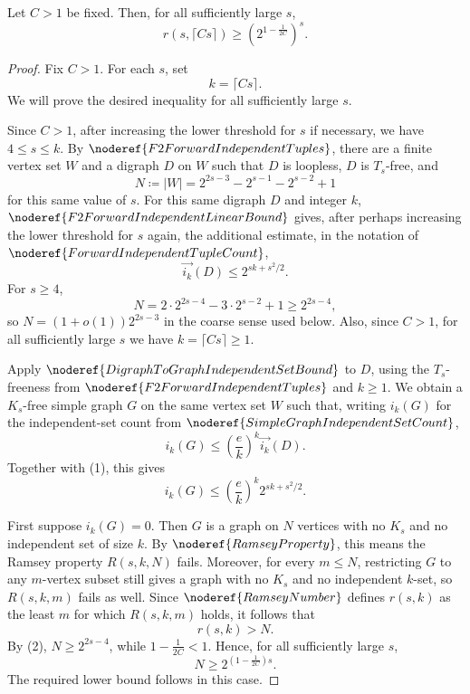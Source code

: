 \begin{theorem}
Let \(C>1\) be fixed. Then, for all sufficiently large \(s\),
\[
  r(s,\lceil Cs\rceil)\ge \left(2^{1-\frac{1}{2C}}\right)^s.
\]
\end{theorem}
\begin{proof}
Fix \(C>1\). For each \(s\), set
\[
  k=\lceil Cs\rceil.
\]
We will prove the desired inequality for all sufficiently large \(s\).

Since \(C>1\), after increasing the lower threshold for \(s\) if necessary, we have \(4\le s\le k\). By \(\noderef{F2ForwardIndependentTuples}\), there are a finite vertex set \(W\) and a digraph \(D\) on \(W\) such that \(D\) is loopless, \(D\) is \(T_s\)-free, and
\[
  N\coloneqq |W|
  =2^{2s-3}-2^{s-1}-2^{s-2}+1
\]
for this same value of \(s\). For this same digraph \(D\) and integer \(k\), \(\noderef{F2ForwardIndependentLinearBound}\) gives, after perhaps increasing the lower threshold for \(s\) again, the additional estimate, in the notation of \(\noderef{ForwardIndependentTupleCount}\),
\[
  \overrightarrow{i_k}(D)
  \le 2^{sk+s^2/2}. \tag{1}
\]
For \(s\ge4\),
\[
  N=2\cdot 2^{2s-4}-3\cdot 2^{s-2}+1
  \ge 2^{2s-4}, \tag{2}
\]
so \(N=(1+o(1))2^{2s-3}\) in the coarse sense used below. Also, since \(C>1\), for all sufficiently large \(s\) we have \(k=\lceil Cs\rceil\ge1\).

Apply \(\noderef{DigraphToGraphIndependentSetBound}\) to \(D\), using the \(T_s\)-freeness from \(\noderef{F2ForwardIndependentTuples}\) and \(k\ge1\). We obtain a \(K_s\)-free simple graph \(G\) on the same vertex set \(W\) such that, writing \(i_k(G)\) for the independent-set count from \(\noderef{SimpleGraphIndependentSetCount}\),
\[
  i_k(G)\le \left(\frac e k\right)^k \overrightarrow{i_k}(D).
\]
Together with (1), this gives
\[
  i_k(G)\le \left(\frac e k\right)^k 2^{sk+s^2/2}. \tag{3}
\]

First suppose \(i_k(G)=0\). Then \(G\) is a graph on \(N\) vertices with no \(K_s\) and no independent set of size \(k\). By \(\noderef{RamseyProperty}\), this means the Ramsey property \(R(s,k,N)\) fails. Moreover, for every \(m\le N\), restricting \(G\) to any \(m\)-vertex subset still gives a graph with no \(K_s\) and no independent \(k\)-set, so \(R(s,k,m)\) fails as well. Since \(\noderef{RamseyNumber}\) defines \(r(s,k)\) as the least \(m\) for which \(R(s,k,m)\) holds, it follows that
\[
  r(s,k)>N.
\]
By (2), \(N\ge2^{2s-4}\), while \(1-\frac1{2C}<1\). Hence, for all sufficiently large \(s\),
\[
  N\ge 2^{(1-\frac1{2C})s}.
\]
The required lower bound follows in this case.


\end{proof}
